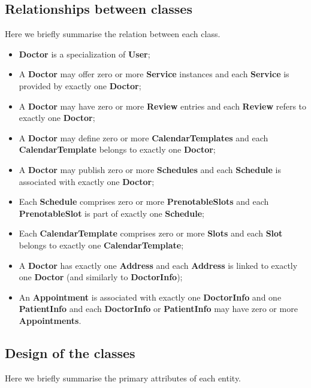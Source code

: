 \subsection{Relationships between classes}
Here we briefly summarise the relation between each class.
\begin{itemize}
	\item \textbf{Doctor} is a specialization of \textbf{User};
	\item A \textbf{Doctor} may offer zero or more \textbf{Service} instances and each \textbf{Service} is provided by exactly one \textbf{Doctor};
	\item A \textbf{Doctor} may have zero or more \textbf{Review} entries and each \textbf{Review} refers to exactly one \textbf{Doctor}; 
	\item A \textbf{Doctor} may define zero or more \textbf{CalendarTemplates} and each \textbf{CalendarTemplate} belongs to exactly one \textbf{Doctor};
	\item A \textbf{Doctor} may publish zero or more \textbf{Schedules} and each \textbf{Schedule} is associated with exactly one \textbf{Doctor};
	\item Each \textbf{Schedule} comprises zero or more \textbf{PrenotableSlots} and each \textbf{PrenotableSlot} is part of exactly one \textbf{Schedule};
	\item Each \textbf{CalendarTemplate} comprises zero or more \textbf{Slots} and each \textbf{Slot} belongs to exactly one \textbf{CalendarTemplate}; 
	\item A \textbf{Doctor} has exactly one \textbf{Address} and each \textbf{Address} is linked to exactly one \textbf{Doctor} (and similarly to \textbf{DoctorInfo}); 
	\item An \textbf{Appointment} is associated with exactly one \textbf{DoctorInfo} and one \textbf{PatientInfo} and each \textbf{DoctorInfo} or \textbf{PatientInfo} may have zero or more \textbf{Appointments}. 
\end{itemize}

\subsection{Design of the classes}
Here we briefly summarise the primary attributes of each entity.

